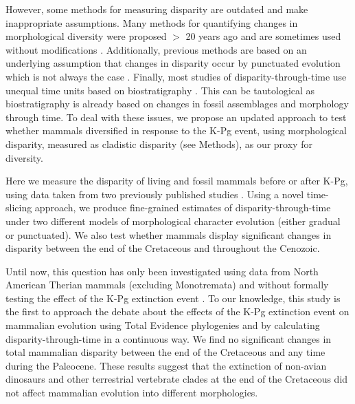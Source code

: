 \documentclass[12pt,letterpaper]{article}
\begin{document}
However, some methods for measuring disparity are outdated and make inappropriate assumptions.
Many methods for quantifying changes in morphological diversity were proposed $>$ 20 years ago \citep{Foote01071994,Wills1994} and are sometimes used without modifications \citep[e.g.,][]{brusatte50,Brusatte12092008,cisneros2010,thorneresetting2011,prentice2011,brusattedinosaur2012,toljagictriassic-jurassic2013,ruta2013,bentonmodels2014,bensonfaunal2014}.
Additionally, previous methods are based on an underlying assumption that changes in disparity occur by punctuated evolution \citep[e.g.][]{Wesley-Hunt2005} which is not always the case \citep{Hunt21042015}.
Finally, most studies of disparity-through-time use unequal time units based on biostratigraphy \citep{Brusatte12092008,brusattedinosaur2012,toljagictriassic-jurassic2013}. 
This can be tautological as biostratigraphy is already based on changes in fossil assemblages and morphology through time.
To deal with these issues, we propose an updated approach to test whether mammals diversified in response to the K-Pg event, using morphological disparity, measured as cladistic disparity (see Methods), as our proxy for diversity.

Here we measure the disparity of living and fossil mammals before or after K-Pg, using data taken from two previously published studies \citep{Slater2012MEE,beckancient2014}. 
Using a novel time-slicing approach, we produce fine-grained estimates of disparity-through-time under two different models of morphological character evolution (either gradual or punctuated). 
We also test whether mammals display significant changes in disparity between the end of the Cretaceous and throughout the Cenozoic.

Until now, this question has only been investigated using data from North American Therian mammals (excluding Monotremata) and without formally testing the effect of the K-Pg extinction event \citep{Wilson2013}.
To our knowledge, this study is the first to approach the debate about the effects of the K-Pg extinction event on mammalian evolution using Total Evidence phylogenies and by calculating disparity-through-time in a continuous way.
We find no significant changes in total mammalian disparity between the end of the Cretaceous and any time during the Paleocene. 
These results suggest that the extinction of non-avian dinosaurs and other terrestrial vertebrate clades at the end of the Cretaceous did not affect mammalian evolution into different morphologies.
\end{document}
